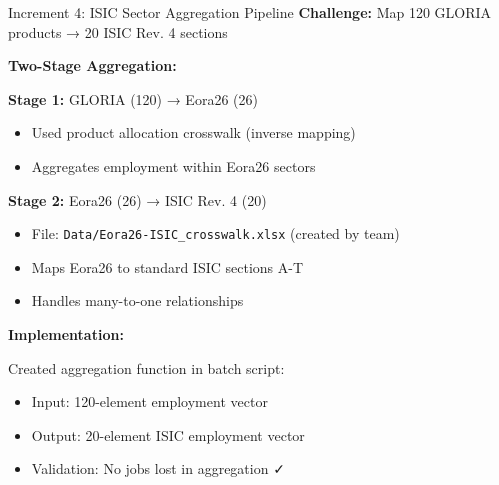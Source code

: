 \documentclass[10pt]{beamer}
\begin{document}

\begin{frame}{Increment 4: ISIC Sector Aggregation Pipeline}
\textbf{Challenge:} Map 120 GLORIA products → 20 ISIC Rev. 4 sections

\vspace{0.3cm}

\textbf{Two-Stage Aggregation:}

\vspace{0.2cm}

\textbf{Stage 1:} GLORIA (120) → Eora26 (26)
\begin{itemize}
    \item Used product allocation crosswalk (inverse mapping)
    \item Aggregates employment within Eora26 sectors
\end{itemize}

\vspace{0.2cm}

\textbf{Stage 2:} Eora26 (26) → ISIC Rev. 4 (20)
\begin{itemize}
    \item File: \texttt{Data/Eora26-ISIC\_crosswalk.xlsx} (created by team)
    \item Maps Eora26 to standard ISIC sections A-T
    \item Handles many-to-one relationships
\end{itemize}

\vspace{0.3cm}

\textbf{Implementation:}

\vspace{0.2cm}

Created aggregation function in batch script:
\begin{itemize}
    \item Input: 120-element employment vector
    \item Output: 20-element ISIC employment vector
    \item Validation: No jobs lost in aggregation ✓
\end{itemize}

\end{frame}
\end{document}
